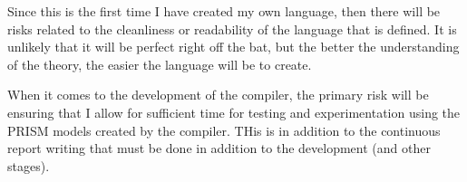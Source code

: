 \documentclass[11pt, a4paper]{article}
\begin{document}
Since this is the first time I have created my own language, then there will be
risks related to the cleanliness or readability of the language that is defined.
It is unlikely that it will be perfect right off the bat, but the better the
understanding of the theory, the easier the language will be to create.

When it comes to the development of the compiler, the primary risk will be
ensuring that I allow for sufficient time for testing and experimentation using
the PRISM models created by the compiler. THis is in addition to the continuous
report writing that must be done in addition to the development (and other
stages).
\end{document}
